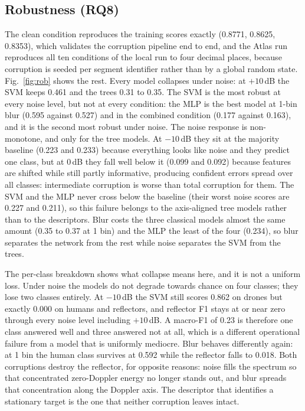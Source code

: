 \documentclass[conference]{IEEEtran}
\begin{document}
\subsection{Robustness (RQ8)}
The clean condition reproduces the training scores exactly (0.8771, 0.8625, 0.8353), which validates the corruption pipeline end to end, and the Atlas run reproduces all ten conditions of the local run to four decimal places, because corruption is seeded per segment identifier rather than by a global random state. Fig.~\ref{fig:rob} shows the rest. Every model collapses under noise: at $+10$\,dB the SVM keeps 0.461 and the trees 0.31 to 0.35. The SVM is the most robust at every noise level, but not at every condition: the MLP is the best model at 1-bin blur (0.595 against 0.527) and in the combined condition (0.177 against 0.163), and it is the second most robust under noise. The noise response is non-monotone, and only for the tree models. At $-10$\,dB they sit at the majority baseline (0.223 and 0.233) because everything looks like noise and they predict one class, but at 0\,dB they fall well below it (0.099 and 0.092) because features are shifted while still partly informative, producing confident errors spread over all classes: intermediate corruption is worse than total corruption for them. The SVM and the MLP never cross below the baseline (their worst noise scores are 0.227 and 0.211), so this failure belongs to the axis-aligned tree models rather than to the descriptors. Blur costs the three classical models almost the same amount (0.35 to 0.37 at 1 bin) and the MLP the least of the four (0.234), so blur separates the network from the rest while noise separates the SVM from the trees.

The per-class breakdown shows what collapse means here, and it is not a uniform loss. Under noise the models do not degrade towards chance on four classes; they lose two classes entirely. At $-10$\,dB the SVM still scores 0.862 on drones but exactly 0.000 on humans and reflectors, and reflector F1 stays at or near zero through every noise level including $+10$\,dB. A macro-F1 of 0.23 is therefore one class answered well and three answered not at all, which is a different operational failure from a model that is uniformly mediocre. Blur behaves differently again: at 1 bin the human class survives at 0.592 while the reflector falls to 0.018. Both corruptions destroy the reflector, for opposite reasons: noise fills the spectrum so that concentrated zero-Doppler energy no longer stands out, and blur spreads that concentration along the Doppler axis. The descriptor that identifies a stationary target is the one that neither corruption leaves intact.
\end{document}
